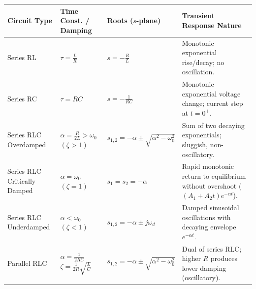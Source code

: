\documentclass[12pt,a4paper]{article}
\renewcommand{\arraystretch}{1.45}
\begin{document}
\begin{tcolorbox}[tikzbox, title={\textbf{Summary Matrix: Comprehensive Comparison of First- and Second-Order Transients}}]
\par\vspace{3pt}\noindent
\begingroup
\footnotesize
\setlength{\tabcolsep}{3.5pt}
\setlength{\extrarowheight}{1.8pt}
\renewcommand{\arraystretch}{1.2}
\begin{tabularx}{\linewidth}{|B{2.3cm}|B{3.2cm}|B{3.2cm}|Y|}
\hline
\textbf{Circuit Type} & \textbf{Time Const. / Damping} & \textbf{Roots ($s$-plane)} & \textbf{Transient Response Nature} \\
\hline
Series RL & $\tau = \frac{L}{R}$ & $s = -\frac{R}{L}$ & Monotonic exponential rise/decay; no oscillation. \\
\hline
Series RC & $\tau = RC$ & $s = -\frac{1}{RC}$ & Monotonic exponential voltage change; current step at $t=0^+$. \\
\hline
Series RLC Overdamped & $\alpha = \frac{R}{2L} > \omega_0$ \newline $(\zeta > 1)$ & $s_{1,2} = -\alpha \pm \sqrt{\alpha^2 - \omega_0^2}$ & Sum of two decaying exponentials; sluggish, non-oscillatory. \\
\hline
Series RLC Critically Damped & $\alpha = \omega_0$ \newline $(\zeta = 1)$ & $s_1 = s_2 = -\alpha$ & Rapid monotonic return to equilibrium without overshoot ($(A_1+A_2 t)e^{-\alpha t}$). \\
\hline
Series RLC Underdamped & $\alpha < \omega_0$ \newline $(\zeta < 1)$ & $s_{1,2} = -\alpha \pm j\omega_d$ & Damped sinusoidal oscillations with decaying envelope $e^{-\alpha t}$. \\
\hline
Parallel RLC & $\alpha = \frac{1}{2RC}$ \newline $\zeta = \frac{1}{2R}\sqrt{\frac{L}{C}}$ & $s_{1,2} = -\alpha \pm \sqrt{\alpha^2 - \omega_0^2}$ & Dual of series RLC; higher $R$ produces lower damping (oscillatory). \\
\hline
\end{tabularx}
\endgroup
\end{tcolorbox}
\end{document}
